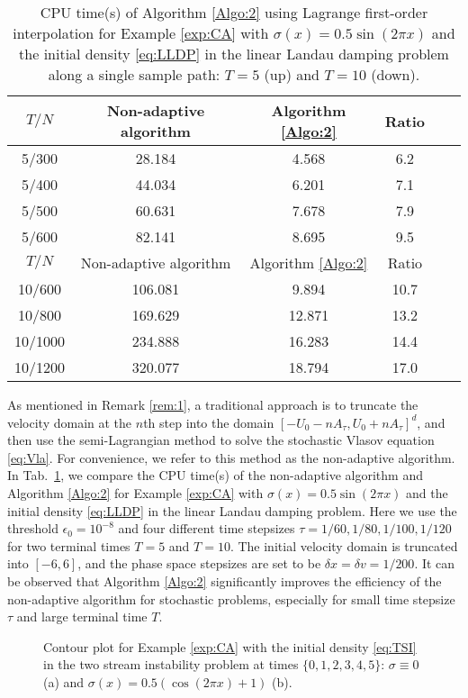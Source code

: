 \documentclass[11pt,reqno]{amsproc}
\numberwithin{equation}{section}
\begin{document}
\begin{table}
 \caption{CPU time\textup{(}s\textup{)} of Algorithm \ref{Algo:2} using Lagrange first-order interpolation for Example \ref{exp:CA} with $\sigma(x)=0.5\sin(2\pi x)$
 and the initial density \eqref{eq:LLDP} in the linear Landau damping problem along a single sample path: $T=5$ \textup{(}up\textup{)} and $T=10$ \textup{(}down\textup{)}.}\label{Tabletime}
\centering
 \begin{tabular}{|c|c|c|c|c|c|}
 \hline
$T/N$ & Non-adaptive algorithm &Algorithm \ref{Algo:2}& Ratio \\ \hline
 5/300 & 28.184 & 4.568 & 6.2 \\ \hline
 5/400 & 44.034 & 6.201 & 7.1 \\ \hline
 5/500 & 60.631 & 7.678 & 7.9 \\ \hline
 5/600 & 82.141 & 8.695 & 9.5 \\ \hline
 \hline
 $T/N$ & Non-adaptive algorithm &Algorithm \ref{Algo:2} &Ratio \\ \hline
 10/600 & 106.081 & 9.894 & 10.7 \\ \hline
 10/800 & 169.629 & 12.871 & 13.2 \\ \hline
 10/1000 & 234.888 & 16.283 & 14.4 \\ \hline
 10/1200 & 320.077 & 18.794 & 17.0 \\ \hline
 \end{tabular}
\end{table}
As mentioned in Remark \ref{rem:1}, a traditional approach is to truncate the velocity domain at the $n$th step into the domain $[-U_0 - nA_\tau, U_0 + nA_\tau]^d$, and then use the semi-Lagrangian method to solve the stochastic Vlasov equation \eqref{eq:Vla}. For convenience, we refer to this method as the non-adaptive algorithm. In Tab.\ \ref{Tabletime}, we compare the CPU time(s) of the non-adaptive algorithm and Algorithm \ref{Algo:2} for Example \ref{exp:CA} with $\sigma(x)=0.5\sin(2\pi x)$ and the initial density \eqref{eq:LLDP} in the linear Landau damping problem. Here we use the threshold $\epsilon_0=10^{-8}$ and four different time stepsizes $\tau = 1/60, 1/80, 1/100, 1/120$ for two terminal times $T= 5$ and $T=10$. The initial velocity domain is truncated into $[-6,6]$, and the phase space stepsizes are set to be $\delta x = \delta v = 1/200$. It can be observed that Algorithm \ref{Algo:2} significantly improves the efficiency of the non-adaptive algorithm for stochastic problems, especially for small time stepsize $\tau$ and large terminal time $T$. 
\begin{figure}[!htb]
 \centering
 \caption{Contour plot for Example \ref{exp:CA} with the initial density \eqref{eq:TSI} in the two stream instability problem at times $\{0,1,2,3,4,5\}$:  $\sigma\equiv0$ \textup{(}a\textup{)} and  $\sigma(x)=0.5(\cos(2\pi x)+1)$ \textup{(}b\textup{)}.
 }\label{FshapeTS-M}
\end{figure}
\end{document}
